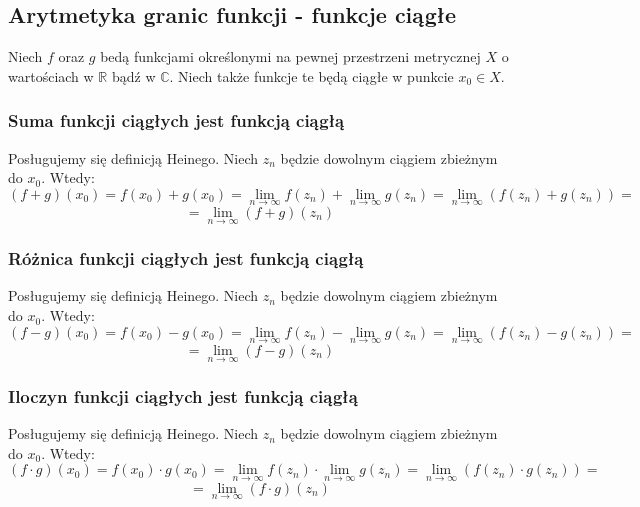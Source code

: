 \documentclass{article}
\begin{document}
\subsection{Arytmetyka granic funkcji - funkcje ciągłe}

Niech \(f\) oraz \(g\) bedą funkcjami określonymi na pewnej przestrzeni metrycznej \(X\) o wartościach
w \(\mathbb{R}\) bądź w \(\mathbb{C}\). Niech także funkcje te będą ciągłe w punkcie \(x_0 \in X\).

\subsubsection{Suma funkcji ciągłych jest funkcją ciągłą}
Posługujemy się definicją Heinego. Niech \(z_n\) będzie dowolnym ciągiem zbieżnym do \(x_0\). Wtedy:
\begin{equation*}
    (f+g)(x_0) = f(x_0) + g(x_0) = \lim_{n \to \infty} f(z_n) + \lim_{n \to \infty} g(z_n) = \lim_{n \to \infty} (f(z_n) + g(z_n)) = 
\end{equation*}
\begin{equation*}
    = \lim_{n \to \infty} (f+g)(z_n)
\end{equation*}

\subsubsection{Różnica funkcji ciągłych jest funkcją ciągłą}
Posługujemy się definicją Heinego. Niech \(z_n\) będzie dowolnym ciągiem zbieżnym do \(x_0\). Wtedy:
\begin{equation*}
    (f-g)(x_0) = f(x_0) - g(x_0) = \lim_{n \to \infty} f(z_n) - \lim_{n \to \infty} g(z_n) = \lim_{n \to \infty} (f(z_n) - g(z_n)) = 
\end{equation*}
\begin{equation*}
    = \lim_{n \to \infty} (f-g)(z_n)
\end{equation*}

\subsubsection{Iloczyn funkcji ciągłych jest funkcją ciągłą}
Posługujemy się definicją Heinego. Niech \(z_n\) będzie dowolnym ciągiem zbieżnym do \(x_0\). Wtedy:
\begin{equation*}
    (f \cdot g)(x_0) = f(x_0) \cdot g(x_0) = \lim_{n \to \infty} f(z_n) \cdot \lim_{n \to \infty} g(z_n) = \lim_{n \to \infty} (f(z_n) \cdot g(z_n)) = 
\end{equation*}
\begin{equation*}
    = \lim_{n \to \infty} (f \cdot g)(z_n)
\end{equation*} 
\end{document}
